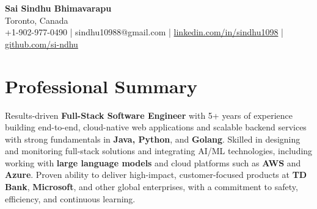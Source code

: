 \documentclass[letterpaper,11pt]{article}
\begin{document}
\begin{center}
  {\Large \textbf{Sai Sindhu Bhimavarapu}} \\
  Toronto, Canada \\
  +1-902-977-0490 \enspace | \enspace sindhu10988@gmail.com \enspace | \enspace \href{https://www.linkedin.com/in/sindhu1098/}{linkedin.com/in/sindhu1098} \enspace | \enspace \href{https://github.com/si-ndhu}{github.com/si-ndhu}
\end{center}

\section{Professional Summary}
  \begin{itemize}[leftmargin=0.15in, label={}]
    \small{\item{
     Results-driven \textbf{Full-Stack Software Engineer} with 5+ years of experience building end-to-end, cloud-native web applications and scalable backend services with strong fundamentals in \textbf{Java, Python}, and \textbf{Golang}. Skilled in designing and monitoring full-stack solutions and integrating AI/ML technologies, including working with \textbf{large language models} and cloud platforms such as \textbf{AWS} and \textbf{Azure}. Proven ability to deliver high-impact, customer-focused products at \textbf{TD Bank}, \textbf{Microsoft}, and other global enterprises, with a commitment to safety, efficiency, and continuous learning.
    }}
  \end{itemize}
\vspace{-16pt}

\end{document}
